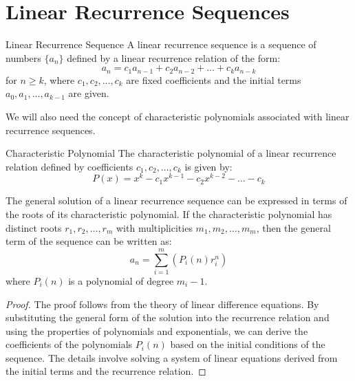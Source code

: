\documentclass[openany]{book}
\begin{document}
\section{Linear Recurrence Sequences}
\begin{mydefinition}{Linear Recurrence Sequence}
A linear recurrence sequence is a sequence of numbers $\{a_n\}$ defined by a linear recurrence relation of the form:
\[a_n = c_1 a_{n-1} + c_2 a_{n-2} + \ldots + c_k a_{n-k}\]
for $n \geq k$, where $c_1, c_2, \ldots, c_k$ are fixed coefficients and the initial terms $a_0, a_1, \ldots, a_{k-1}$ are given.
\end{mydefinition}
We will also need the concept of characteristic polynomials associated with linear recurrence sequences.
\begin{mydefinition}{Characteristic Polynomial}
The characteristic polynomial of a linear recurrence relation defined by coefficients $c_1, c_2, \ldots, c_k$ is given by:
\[P(x) = x^k - c_1 x^{k-1} - c_2 x^{k-2} - \ldots - c_k\]
\end{mydefinition}
\begin{mytheorem}
The general solution of a linear recurrence sequence can be expressed in terms of the roots of its characteristic polynomial. If the characteristic polynomial has distinct roots $r_1, r_2, \ldots, r_m$ with multiplicities $m_1, m_2, \ldots, m_m$, then the general term of the sequence can be written as:
\[a_n = \sum_{i=1}^{m} \left( P_i(n) r_i^n \right)\]
where $P_i(n)$ is a polynomial of degree $m_i - 1$.
\end{mytheorem}
\begin{proof}
The proof follows from the theory of linear difference equations. By substituting the general form of the solution into the recurrence relation and using the properties of polynomials and exponentials, we can derive the coefficients of the polynomials $P_i(n)$ based on the initial conditions of the sequence. The details involve solving a system of linear equations derived from the initial terms and the recurrence relation.
\end{proof}
\end{document}
